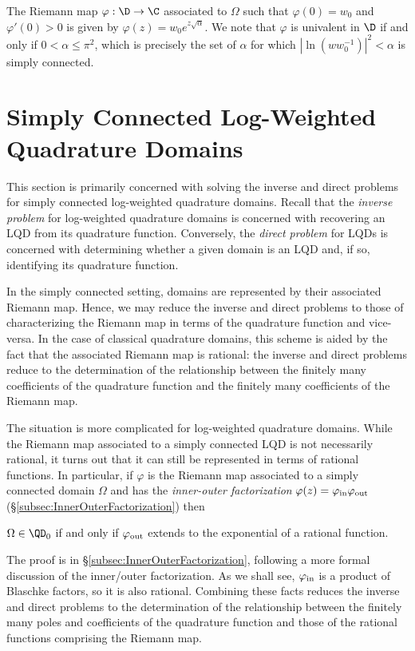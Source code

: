 \documentclass{article}
\numberwithin{equation}{section}
\begin{document}
The Riemann map $\varphi:\D\rightarrow\C$ associated to $\Omega$ such that $\varphi(0)=w_0$ and $\varphi'(0)>0$ is given by $\varphi(z)=w_0e^{z\sqrt{\alpha}}$. We note that $\varphi$ is univalent in $\D$ if and only if $0<\alpha\leq\pi^2$, which is precisely the set of $\alpha$ for which $|\ln(ww_0^{-1})|^2<\alpha$ is simply connected.












\section{Simply Connected Log-Weighted Quadrature Domains}\label{sec:SimplyConnectedLQDs}
This section is primarily concerned with solving the inverse and direct problems for simply connected log-weighted quadrature domains. Recall that the {\it inverse problem} for log-weighted quadrature domains is concerned with recovering an LQD from its quadrature function. Conversely, the {\it direct problem} for LQDs is concerned with determining whether a given domain is an LQD and, if so, identifying its quadrature function. 

In the simply connected setting, domains are represented by their associated Riemann map. Hence, we may reduce the inverse and direct problems to those of characterizing the Riemann map in terms of the quadrature function and vice-versa. In the case of classical quadrature domains, this scheme is aided by the fact that the associated Riemann map is rational: the inverse and direct problems reduce to the determination of the relationship between the finitely many coefficients of the quadrature function and the finitely many coefficients of the Riemann map.

The situation is more complicated for log-weighted quadrature domains. While the Riemann map associated to a simply connected LQD is not necessarily rational, it turns out that it can still be represented in terms of rational functions. In particular, if $\varphi$ is the Riemann map associated to a simply connected domain $\Omega$ and has the {\it inner-outer factorization} $\varphi(z)=\varphi_{\rm in}\varphi_{\rm out}$ (\S\ref{subsec:InnerOuterFactorization}) then
\begin{theorem}\label{thm:SCLQDCharacterization}
$\Omega\in\QD_0$ if and only if $\varphi_{\rm out}$ extends to the exponential of a rational function.
\end{theorem}
The proof is in \S\ref{subsec:InnerOuterFactorization}, following a more formal discussion of the inner/outer factorization. As we shall see, $\varphi_{\rm in}$ is a product of Blaschke factors, so it is also rational. Combining these facts reduces the inverse and direct problems to the determination of the relationship between the finitely many poles and coefficients of the quadrature function and those of the rational functions comprising the Riemann map. 
\end{document}

